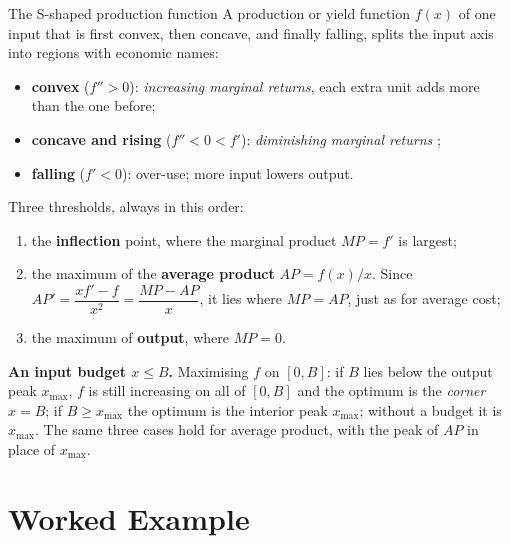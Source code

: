 \begin{rulebox}{The S-shaped production function}
A production or yield function $f(x)$ of one input that is first convex,
then concave, and finally falling, splits the input axis into regions
with economic names:
\begin{itemize}[leftmargin=1.6em,itemsep=0.4ex]
  \item \textbf{convex} ($f''>0$): \emph{increasing marginal returns}, each
        extra unit adds more than the one before;
  \item \textbf{concave and rising} ($f''<0<f'$): \emph{diminishing
        marginal returns} ;
  \item \textbf{falling} ($f'<0$): over-use; more input lowers output.
\end{itemize}
Three thresholds, always in this order:
\begin{enumerate}[leftmargin=1.6em,itemsep=0.3ex]
  \item the \textbf{inflection} point, where the marginal product $MP=f'$
        is largest;
  \item the maximum of the \textbf{average product} $AP=f(x)/x$. Since
        $AP'=\dfrac{xf'-f}{x^{2}}=\dfrac{MP-AP}{x}$, it lies where
        $MP=AP$, just as for average cost;
  \item the maximum of \textbf{output}, where $MP=0$.
\end{enumerate}
\textbf{An input budget $x\le B$.} Maximising $f$ on $[0,B]$: if $B$ lies
below the output peak $x_{\max}$, $f$ is still increasing on all of
$[0,B]$ and the optimum is the \emph{corner} $x=B$; if $B\ge x_{\max}$ the
optimum is the interior peak $x_{\max}$; without a budget it is
$x_{\max}$. The same three cases hold for average product, with the peak
of $AP$ in place of $x_{\max}$.
\end{rulebox}

\section{Worked Example}

